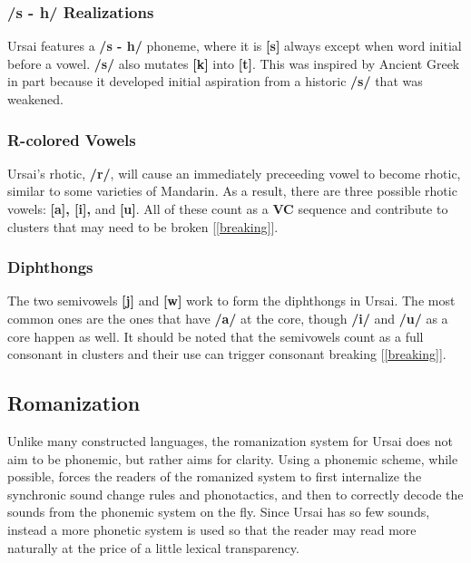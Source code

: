 \documentclass[11pt,letterpaper]{article}
\begin{document}
		\subsubsection{/s - h/ Realizations}
		\par
		Ursai features a \textbf{/s - h/} phoneme, where it is \textbf{[s]} always except when word initial before a vowel.  \textbf{/s/} also mutates \textbf{[k]} into \textbf{[t]}.  This was inspired by Ancient Greek\cite{GreekPhonology} in part because it developed initial aspiration from a historic \textbf{/s/} that was weakened.
		\subsubsection{R-colored Vowels}
		Ursai's rhotic, \textbf{/r/}, will cause an immediately preceeding vowel to become rhotic, similar to some varieties of Mandarin\cite{Erhua}.  As a result, there are three possible rhotic vowels: \textbf{[a\textrhoticity], [i\textrhoticity],} and \textbf{[u\textrhoticity]}. All of these count as a \textbf{VC} sequence and contribute to clusters that may need to be broken [\ref{breaking}].
		\subsubsection{Diphthongs}
		The two semivowels \textbf{[j]} and \textbf{[w]} work to form the diphthongs in Ursai.  The most common ones are the ones that have \textbf{/a/} at the core, though \textbf{/i/} and \textbf{/u/} as a core happen as well.  It should be noted that the semivowels count as a full consonant in clusters and their use can trigger consonant breaking [\ref{breaking}]. 
	\subsection{Romanization}
		\par 
		Unlike many constructed languages, the romanization system for Ursai does not aim to be phonemic, but rather aims for clarity.  Using a phonemic scheme, while possible, forces the readers of the romanized system to first internalize the synchronic sound change rules and phonotactics, and then to correctly decode the sounds from the phonemic system on the fly.  Since Ursai has so few sounds, instead a more phonetic system is used so that the reader may read more naturally at the price of a little lexical transparency.
\end{document}
